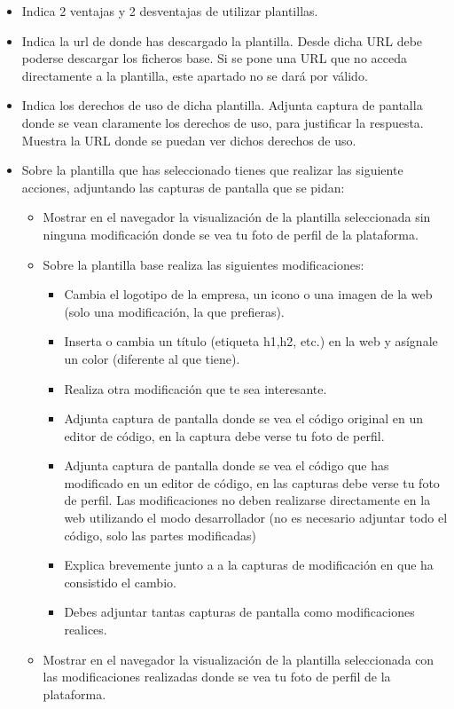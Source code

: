 \begin{itemize}
    \item Indica 2 ventajas y 2 desventajas de utilizar plantillas.
    \item Indica la url de donde has descargado la plantilla. Desde dicha URL debe poderse descargar los ficheros base. Si se pone una URL que no acceda directamente a la plantilla, este apartado no se dará por válido.
    \item Indica los derechos de uso de dicha plantilla. Adjunta captura de pantalla donde se vean claramente los derechos de uso, para justificar la respuesta. Muestra la URL donde se puedan ver dichos derechos de uso.
    \item Sobre la plantilla que has seleccionado tienes que realizar las siguiente acciones, adjuntando las capturas de pantalla que se pidan:
    \begin{itemize}
        \item Mostrar en el navegador la visualización de la plantilla seleccionada sin ninguna modificación donde se vea tu foto de perfil de la plataforma.
        \item Sobre la plantilla base realiza las siguientes modificaciones:
        \begin{itemize}
            \item Cambia el logotipo de la empresa, un icono  o una imagen de la web (solo una modificación, la que prefieras).
            \item Inserta o cambia un título (etiqueta h1,h2, etc.) en la web y asígnale un color (diferente al que tiene).
            \item Realiza otra modificación que te sea interesante.
            \item Adjunta captura de pantalla donde se vea el código original en un editor de código, en la captura debe verse tu foto de perfil.
            \item Adjunta captura de pantalla donde se vea el código que has modificado en un editor de código, en las capturas debe verse tu foto de perfil. Las modificaciones no deben realizarse directamente en la web utilizando el modo desarrollador (no es necesario adjuntar todo el código, solo las partes modificadas)
            \item Explica brevemente junto a a la capturas de modificación en que ha consistido el cambio.
            \item Debes adjuntar tantas capturas de pantalla como modificaciones realices.
        \end{itemize}
        \item Mostrar en el navegador la visualización de la plantilla seleccionada con las modificaciones realizadas donde se vea tu foto de perfil de la plataforma.
    \end{itemize}
\end{itemize}

